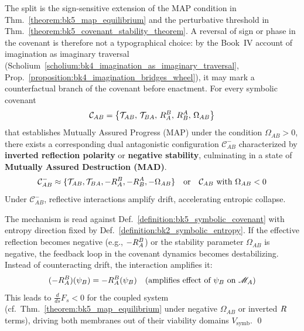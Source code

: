 \begin{proposition}
\label{proposition:bk5_map_mad_dichotomy}
The split is the sign-sensitive extension of the MAP condition in Thm.~\ref{theorem:bk5_map_equilibrium} and the perturbative threshold in Thm.~\ref{theorem:bk5_covenant_stability_theorem}.
A reversal of sign or phase in the covenant is therefore not a typographical choice: by the Book~IV account of imagination as imaginary traversal (Scholium~\ref{scholium:bk4_imagination_as_imaginary_traversal}, Prop.~\ref{proposition:bk4_imagination_bridges_wheel}), it may mark a counterfactual branch of the covenant before enactment.
For every symbolic covenant
\[
\mathcal{C}_{AB} = \left\{ \mathcal{T}_{AB},\, \mathcal{T}_{BA},\, R_A^B,\, R_B^A,\, \Omega_{AB} \right\}
\]
that establishes Mutually Assured Progress (MAP) under the condition \( \Omega_{AB} > 0 \),
there exists a corresponding dual antagonistic configuration \( \mathcal{C}_{AB}^{-} \)
characterized by \textbf{inverted reflection polarity} or \textbf{negative stability}, culminating in a
state of \textbf{Mutually Assured Destruction (MAD)}.
\begin{equation}
\mathcal{C}_{AB}^{-} \approx \{\mathcal{T}_{AB}, \mathcal{T}_{BA}, -R_A^B, -R_B^A, -\Omega_{AB}\} \quad \text{or} \quad \mathcal{C}_{AB} \text{ with } \Omega_{AB} < 0
\end{equation}
Under $\mathcal{C}_{AB}^{-}$, reflective interactions amplify drift, accelerating entropic collapse.
\end{proposition}
\begin{demonstratio}
\label{demonstratio:bk5_negative_reflection_instability}
The mechanism is read against Def.~\ref{definition:bk5_symbolic_covenant} with entropy direction fixed by Def.~\ref{definition:bk2_symbolic_entropy}.
If the effective reflection becomes negative (e.g., $-R_A^B$) or the stability parameter $\Omega_{AB}$ is negative, the feedback loop in the covenant dynamics becomes destabilizing. Instead of counteracting drift, the interaction amplifies it:
\begin{equation}
(-R_A^B)(\psi_B) = -R_A^B(\psi_B) \quad \text{(amplifies effect of } \psi_B \text{ on } \mathscr{M}_A)
\end{equation}
This leads to $\frac{d}{ds}F_s < 0$ for the coupled system (cf.~Thm.~\ref{theorem:bk5_map_equilibrium} under negative $\Omega_{AB}$ or inverted $R$ terms), driving both membranes out of their viability domains $V_{\text{symb}}$. \qed
\end{demonstratio}
